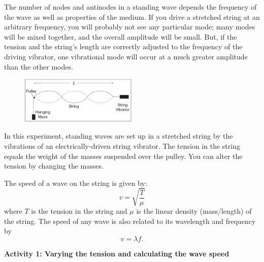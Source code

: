 The number of nodes and antinodes in a standing wave depends the frequency of the wave as well as properties of the medium.  
If you drive a stretched string at an arbitrary frequency, you will probably not see any particular mode; many modes will be mixed together, and the overall amplitude will be small.
But, if the tension and the string's length are correctly adjusted to the frequency of the driving vibrator, one vibrational mode will occur at a much
greater amplitude than the other modes.

\begin{figure}
\vspace{-0.15in}
    \includegraphics[width=0.5\textwidth]{standing_waves_strings/standing_waves_strings_fig2_tb.eps}
\end{figure}

\vspace{0.1in}
In this experiment, standing waves are set up in a stretched string by the vibrations of an electrically-driven string vibrator. The tension in the
string equals the weight of the masses suspended over the pulley. You can alter the tension by
changing the masses. 


The speed of a wave on the string is given by:
\begin{equation*}
v=\sqrt{\frac {T}{\mu }}
\end{equation*}
where $T$ is the tension in the string and $\mu $ is the linear density (mass/length) of the string.  The speed of any wave is also related to its wavelength and frequency by
\begin{equation*}
v=\lambda f.
\end{equation*}


\textbf{Activity 1: Varying the tension and calculating the wave speed}

